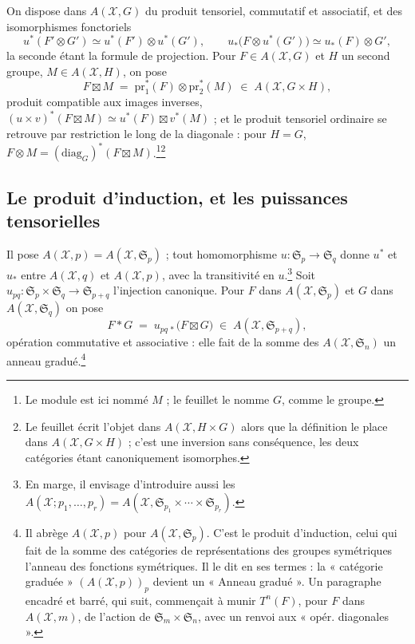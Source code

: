 \documentclass[11pt,a4paper]{article}
\begin{document}
On dispose dans $A(\mathcal{X}, G)$ du produit tensoriel, commutatif et
associatif, et des isomorphismes fonctoriels
\[
  u^{*}(F' \otimes G') \simeq u^{*}(F') \otimes u^{*}(G'),
  \qquad
  u_{*}\bigl(F \otimes u^{*}(G')\bigr) \simeq u_{*}(F) \otimes G' ,
\]
la seconde étant la formule de projection. Pour $F \in A(\mathcal{X}, G)$ et
$H$ un second groupe, $M \in A(\mathcal{X}, H)$, on pose
\[
  F \boxtimes M \;=\; \mathrm{pr}_{1}^{*}(F) \otimes \mathrm{pr}_{2}^{*}(M)
  \;\in\; A(\mathcal{X}, G \times H),
\]
produit compatible aux images inverses, $(u \times v)^{*}(F \boxtimes M)
\simeq u^{*}(F) \boxtimes v^{*}(M)$ ; et le produit tensoriel ordinaire se
retrouve par restriction le long de la diagonale : pour $H = G$, $F \otimes M =
(\mathrm{diag}_{G})^{*}(F \boxtimes M)$.\footnote{Le module est ici nommé $M$ ; le
feuillet le nomme $G$, comme le groupe.}\footnote{Le feuillet écrit l'objet dans $A(\mathcal{X}, H \times G)$ alors
que la définition le place dans $A(\mathcal{X}, G \times H)$ ; c'est une
inversion sans conséquence, les deux catégories étant canoniquement
isomorphes.}

\subsection*{Le produit d'induction, et les puissances tensorielles}

Il pose $A(\mathcal{X}, p) = A(\mathcal{X}, \mathfrak{S}_{p})$ ; tout
homomorphisme $u : \mathfrak{S}_{p} \to \mathfrak{S}_{q}$ donne $u^{*}$ et
$u_{*}$ entre $A(\mathcal{X}, q)$ et $A(\mathcal{X}, p)$, avec la transitivité
en $u$.\footnote{En marge, il envisage d'introduire aussi les
$A(\mathcal{X}; p_{1}, \ldots, p_{r}) = A(\mathcal{X}, \mathfrak{S}_{p_{1}}
\times \cdots \times \mathfrak{S}_{p_{r}})$.} Soit $u_{pq} : \mathfrak{S}_{p} \times \mathfrak{S}_{q} \to
\mathfrak{S}_{p+q}$ l'injection canonique. Pour $F$ dans
$A(\mathcal{X}, \mathfrak{S}_{p})$ et $G$ dans $A(\mathcal{X}, \mathfrak{S}_{q})$
on pose
\[
  F \ast G \;=\; u_{pq\,*}\bigl(F \boxtimes G\bigr)
  \;\in\; A(\mathcal{X}, \mathfrak{S}_{p+q}),
\]
opération commutative et associative : elle fait de la somme des
$A(\mathcal{X}, \mathfrak{S}_{n})$ un anneau gradué.\footnote{Il abrège
$A(\mathcal{X}, p)$ pour $A(\mathcal{X}, \mathfrak{S}_{p})$. C'est le produit
d'induction, celui qui fait de la somme des catégories de représentations des
groupes symétriques l'anneau des fonctions symétriques. Il le dit en ses
termes : la « catégorie graduée » $(A(\mathcal{X}, p))_{p}$ devient un
« Anneau gradué ». Un paragraphe encadré et barré, qui suit, commençait à
munir $T^{n}(F)$, pour $F$ dans $A(\mathcal{X}, m)$, de l'action de
$\mathfrak{S}_{m} \times \mathfrak{S}_{n}$, avec un renvoi aux « opér.
diagonales ».}
\end{document}
